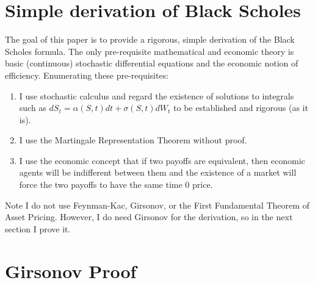 \documentclass{article}
\begin{document}
\section{Simple derivation of Black Scholes}

The goal of this paper is to provide a rigorous, simple derivation of the Black Scholes formula.  The only pre-requisite mathematical and economic theory is basic (continuous) stochastic differential equations and the economic notion of efficiency.  Enumerating these pre-requisites:
\begin{enumerate}
	\item I use stochastic calculus and regard the existence of solutions to integrals such as \(dS_t=\alpha(S, t)dt+\sigma(S, t)dW_t\) to be established and rigorous (as it is).
	\item I use the Martingale Representation Theorem without proof.
	\item I use the economic concept that if two payoffs are equivalent, then economic agents will be indifferent between them and the existence of a market will force the two payoffs to have the same time \(0\) price.
\end{enumerate}

Note I do not use Feynman-Kac, Girsonov, or the First Fundamental Theorem of Asset Pricing.  However, I do need Girsonov for the derivation, so in the next section I prove it.

\section{Girsonov Proof}
\end{document}
